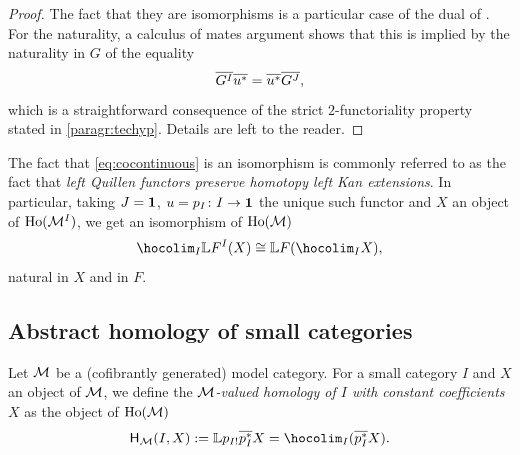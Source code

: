 \begin{proof}
 The fact that they are isomorphisms is a particular case of the dual
 of \cite[Proposition 6.12]{cisinski:images}. For the naturality, a
 calculus of mates argument shows that this is implied by the naturality
 in $G$
 of the equality
 \[
   \GZ{\fun{I}{G}}\GZ{u^*}=\GZ{u^*}\GZ{\fun{J}{G}},
 \]
 which is a straightforward consequence of the strict
 $2$\nbd-functoriality property stated in \ref{paragr:techyp}. Details
 are left to the reader.
\end{proof}
\begin{remark}
  The fact that \eqref{eq:cocontinuous} is an isomorphism is commonly
  referred to as the fact that \emph{left Quillen functors preserve
    homotopy left Kan extensions}. In particular, taking $J=\Term$,
  $u=p_I \colon I \to \Term$ the unique such functor and $X$ an
  object of $\Loc{\fun{I}{\M}}$, we get an isomorphism of $\Loc{\M}$
  \begin{equation}\label{eq:htpycolim}
    \hocolim_I \LL \fun{I}{F}(X) \cong \LL F (\hocolim_I X),
  \end{equation}
  natural in $X$ and in $F$.
\end{remark}
\subsection{Abstract homology of small categories}\label{abstracthom}
\begin{definition}\label{def:abstracthom}
  Let $\M$ be a (cofibrantly generated) model category. For a small
  category $I$ and $X$ an object of $\M$, we define the \emph{$\M$\nbd-valued
    homology of $I$ with constant coefficients $X$} as the object of $\Loc{\M}$
  \[
    \Ho_{\M}(I,X):=\LL p_{I!}\GZ{p_I^*}X=\hocolim_I (\GZ{p_I^*}X).
  \]
\end{definition}

